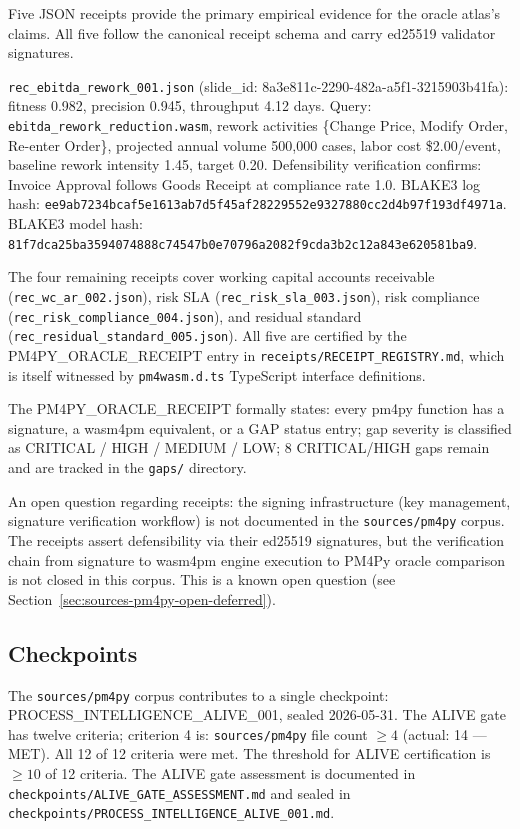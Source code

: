 Five JSON receipts provide the primary empirical evidence for the oracle atlas's claims.
All five follow the canonical receipt schema and carry ed25519 validator signatures.

\texttt{rec\_ebitda\_rework\_001.json} (slide\_id: 8a3e811c-2290-482a-a5f1-3215903b41fa):
fitness 0.982, precision 0.945, throughput 4.12 days. Query: \texttt{ebitda\_rework\_reduction.wasm},
rework activities \{Change Price, Modify Order, Re-enter Order\}, projected annual volume
500,000 cases, labor cost \$2.00/event, baseline rework intensity 1.45, target 0.20.
Defensibility verification confirms: Invoice Approval follows Goods Receipt at compliance
rate 1.0. BLAKE3 log hash: \texttt{ee9ab7234bcaf5e1613ab7d5f45af28229552e9327880cc2d4b97f193df4971a}.
BLAKE3 model hash: \texttt{81f7dca25ba3594074888c74547b0e70796a2082f9cda3b2c12a843e620581ba9}.

The four remaining receipts cover working capital accounts receivable
(\texttt{rec\_wc\_ar\_002.json}), risk SLA (\texttt{rec\_risk\_sla\_003.json}), risk
compliance (\texttt{rec\_risk\_compliance\_004.json}), and residual standard
(\texttt{rec\_residual\_standard\_005.json}). All five are certified by the PM4PY\_ORACLE\_RECEIPT
entry in \texttt{receipts/RECEIPT\_REGISTRY.md}, which is itself witnessed by
\texttt{pm4wasm.d.ts} TypeScript interface definitions.

The PM4PY\_ORACLE\_RECEIPT formally states: every pm4py function has a signature, a wasm4pm
equivalent, or a GAP status entry; gap severity is classified as CRITICAL / HIGH / MEDIUM
/ LOW; 8 CRITICAL/HIGH gaps remain and are tracked in the \texttt{gaps/} directory.

An open question regarding receipts: the signing infrastructure (key management, signature
verification workflow) is not documented in the \texttt{sources/pm4py} corpus. The receipts
assert defensibility via their ed25519 signatures, but the verification chain from signature
to wasm4pm engine execution to PM4Py oracle comparison is not closed in this corpus. This
is a known open question (see Section~\ref{sec:sources-pm4py-open-deferred}).

\subsection{Checkpoints}
\label{sec:sources-pm4py-evidence-checkpoints}

The \texttt{sources/pm4py} corpus contributes to a single checkpoint: PROCESS\_INTELLIGENCE\_ALIVE\_001,
sealed 2026-05-31. The ALIVE gate has twelve criteria; criterion 4 is:
\texttt{sources/pm4py} file count $\geq 4$ (actual: 14 --- MET). All 12 of 12 criteria
were met. The threshold for ALIVE certification is $\geq 10$ of 12 criteria. The ALIVE gate
assessment is documented in \texttt{checkpoints/ALIVE\_GATE\_ASSESSMENT.md} and sealed in
\texttt{checkpoints/PROCESS\_INTELLIGENCE\_ALIVE\_001.md}.

